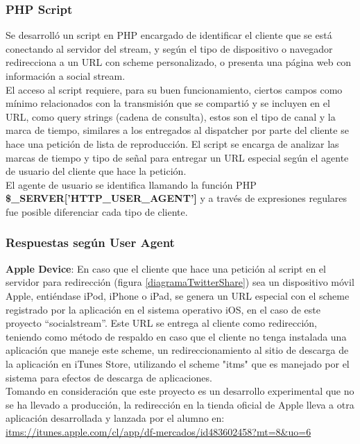 		\subsubsection{PHP Script}
		\label{subsec:php-redir}
Se desarrolló un script en PHP encargado de identificar el cliente que se está conectando al servidor del stream, y según el tipo de dispositivo o navegador redirecciona a un URL con scheme personalizado, o presenta una página web con información a social stream.\\

El acceso al script requiere, para su buen funcionamiento, ciertos campos como mínimo relacionados con la transmisión que se compartió y se incluyen en el URL, como query strings (cadena de consulta), estos son el tipo de canal y la marca de tiempo, similares a los entregados al dispatcher por parte del cliente se hace una petición de lista de reproducción.
El script se encarga de analizar las marcas de tiempo y tipo de señal para entregar un URL especial según el agente de usuario del cliente que hace la petición.\\

El agente de usuario se identifica llamando la función PHP \textbf{\$\_SERVER['HTTP\_USER\_AGENT']} y a través de expresiones regulares fue posible diferenciar cada tipo de cliente.

		\subsubsection{Respuestas según User Agent}
\textbf{Apple Device}: En caso que el cliente que hace una petición al script en el servidor para redirección (figura \ref{diagramaTwitterShare}) sea un dispositivo móvil Apple, entiéndase iPod, iPhone o iPad, se genera un URL especial con el scheme registrado por la aplicación en el sistema operativo iOS, en el caso de este proyecto \textquotedblleft socialstream\textquotedblright . Este URL se entrega al cliente como redirección, teniendo como método de respaldo en caso que el cliente no tenga instalada una aplicación que maneje este scheme, un redireccionamiento al sitio de descarga de la aplicación en iTunes Store, utilizando el scheme "itms" que es manejado por el sistema para efectos de descarga de aplicaciones. \\ 

Tomando en consideración que este proyecto es un desarrollo experimental que no se ha llevado a producción, la redirección en la tienda oficial de Apple lleva a otra aplicación desarrollada y lanzada por el alumno en: \url{itms://itunes.apple.com/cl/app/df-mercados/id483602458?mt=8\&uo=6} \\

